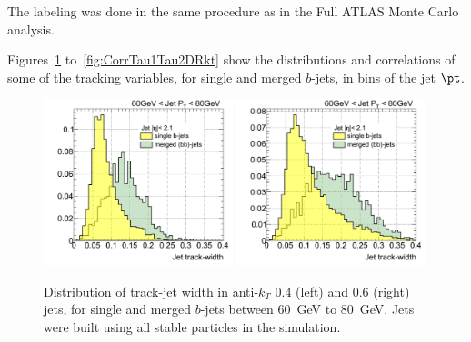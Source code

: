 The labeling was done in the same procedure as in the Full ATLAS Monte Carlo analysis.

Figures~\ref{fig:pythiaTrkWidthAnkt4and6} to~\ref{fig:CorrTau1Tau2DRkt} show the distributions and correlations of some of the tracking variables, for single and merged $b$-jets, in bins of the jet $\pt$.


\begin{figure}[tp]
\centering
\includegraphics[width=0.49\textwidth]{FIGS/TEMPFigs/PythisStandalone/Antikt4/allparticles/trkWidth060.pdf}
\includegraphics[width=0.49\textwidth]{FIGS/TEMPFigs/PythisStandalone/Antikt6/allparticles/trkWidth060.pdf}
\caption{Distribution of track-jet width in anti-$k_T$ 0.4 (left) and 0.6 (right) jets, for single and merged $b$-jets between 60~GeV to 80~GeV. Jets were built using all stable particles in the simulation.}
\label{fig:pythiaTrkWidthAnkt4and6}
\end{figure}

